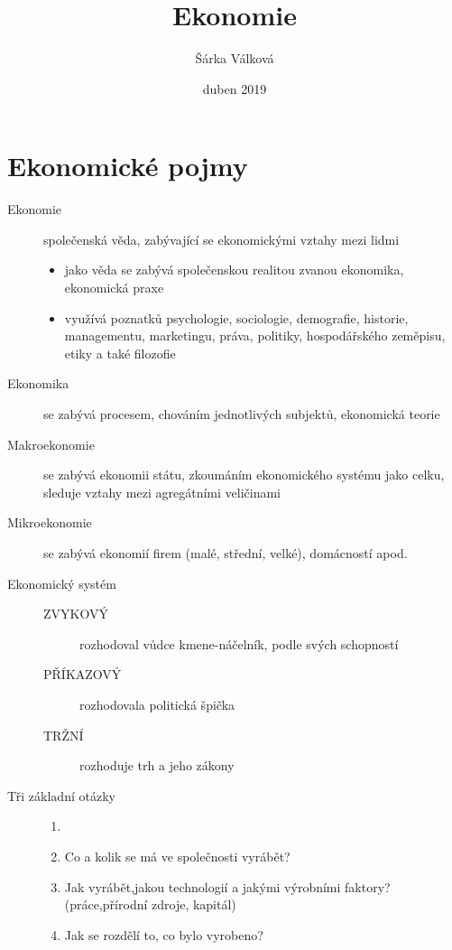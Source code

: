 \documentclass[11pt,a4paper,twoside]{book}
\title{Ekonomie}
\author{Šárka Válková}
\date{duben 2019}
\begin{document}
\maketitle
\newpage
{}
\frenchspacing



\chapter{Ekonomické pojmy}

\begin{description}
	\item[Ekonomie] společenská věda, zabývající se ekonomickými vztahy mezi lidmi
	\begin{itemize}
		\item jako věda se zabývá společenskou realitou zvanou ekonomika, ekonomická praxe
		\item využívá poznatků psychologie, sociologie, demografie, historie, managementu, marketingu, práva, politiky, hospodářského zeměpisu, etiky a také filozofie
	\end{itemize}
	\item[Ekonomika] se zabývá procesem, chováním jednotlivých subjektů, ekonomická teorie
	\item[Makroekonomie] se zabývá ekonomii státu, zkoumáním ekonomického systému jako celku, sleduje vztahy mezi agregátními veličinami
	\item[Mikroekonomie] se zabývá ekonomií firem (malé, střední, velké), domácností apod.
	\item[Ekonomický systém]
	\begin{description}
		\item[]
		\item[ZVYKOVÝ] rozhodoval vůdce kmene-náčelník, podle svých schopností
		\item[PŘÍKAZOVÝ] rozhodovala politická špička
		\item[TRŽNÍ] rozhoduje trh a jeho zákony
	\end{description}
	\item[Tři základní otázky]
	\begin{enumerate}
	\item[]
	\item Co a kolik se má ve společnosti vyrábět?
	\item Jak vyrábět,jakou technologií a jakými výrobními faktory?(práce,přírodní zdroje, kapitál)
	\item Jak se rozdělí to, co bylo vyrobeno?

\end{enumerate}
\end{description}
\end{document}
